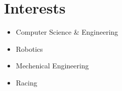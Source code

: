\documentclass[a4paper,12pt]{article}
\begin{document}
\section{Interests}
\begin{itemize}
    \item Computer Science \& Engineering
    \item Robotics
    \item Mechenical Engineering
    \item Racing
\end{itemize}



\end{document}
